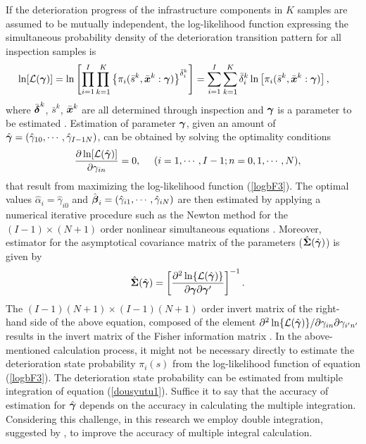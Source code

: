 If the deterioration progress of the infrastructure components in  $K$ samples are assumed to be mutually independent, the log-likelihood function expressing the simultaneous probability density of the deterioration transition pattern for all inspection samples is  
\begin{eqnarray}
&& \hspace{-10mm} \ln[{\cal L}(\mbox{\boldmath$\gamma$})] = \ln
\left[\prod_{i=1}^{I} \prod_{k=1}^{K}
\left\{\pi_{i}(\bar{s}^k,\bar{\mbox{\boldmath$x$}}^k:\mbox{\boldmath$\gamma$})\right\}^{\bar{\delta}_{i}^k}\right]
 =\sum_{i=1}^I \sum_{k=1}^{K} \bar{\delta}_{i}^k
\ln\left[
\pi_{i}(\bar{s}^k,\bar{\mbox{\boldmath$x$}}^k:\mbox{\boldmath$\gamma$})\right],
\label{logbF3}
\end{eqnarray}
where $\bar{\mbox{\boldmath$\delta$}}^k$, $\bar{s}^k$, $\bar{\mbox{\boldmath$x$}}^k$ are all determined through inspection and $\mbox{\boldmath$\gamma$}$ is a parameter to be estimated \cite{tobin,amemi}. Estimation of parameter  $\mbox{\boldmath$\gamma$}$, given an amount of $\hat{\mbox{\boldmath$\gamma$}}=(\hat{\gamma}_{10},\cdots,\hat{\gamma}_{I-1N})$, can be obtained by solving the optimality conditions
\begin{eqnarray}
&& \frac{ \partial \ln[{\cal L}(\hat{\mbox{\boldmath$\gamma$}})] }{\partial
\gamma_{in}}=0, \quad ~(i=1,\cdots,I-1;n=0,1,\cdots,N), \label{saiteki3}
\end{eqnarray}
that result from maximizing the log-likelihood function (\ref{logbF3}). The optimal values $\hat{\alpha}_i=\hat{\gamma}_{i0}$ and $\hat{\mbox{\boldmath$\beta$}}_i=(\hat{\gamma}_{i1},\cdots,\hat{\gamma}_{iN})$ are then estimated by applying a numerical iterative procedure such as the Newton method for the $(I-1)\times (N+1)$ order nonlinear simultaneous equations \cite{tuma}. Moreover, estimator for the asymptotical covariance matrix of the parameters ($\hat{\mbox{\boldmath$\Sigma$}}(\hat{\mbox{\boldmath$\gamma$}})$) is given by
\begin{eqnarray}
&& \hat{\mbox{\boldmath$\Sigma$}}( \hat{\mbox{\boldmath$\gamma$}})
= \left[ \frac{ \partial^2\ln\{ {\cal L}( \hat{\mbox{\boldmath$\gamma$}})\}
}{\partial \mbox{\boldmath$\gamma$} \partial \mbox{\boldmath$\gamma$}'}
\right]^{-1}.
\end{eqnarray}
The $(I-1)(N+1)\times (I-1)(N+1)$ order invert matrix of the right-hand side of the above equation, composed of the element $\partial^2\ln\{{\cal L}(\hat{\mbox{\boldmath$\gamma$}})\}/\partial \gamma_{in} \partial \gamma_{i^\prime n^\prime}$ results in the invert matrix of the Fisher information matrix \cite{greene}. In the above-mentioned calculation process, it might not be necessary directly to estimate the deterioration state probability $\pi_i(s)$ from the log-likelihood function of equation (\ref{logbF3}). The deterioration state probability can be estimated from multiple integration of equation (\ref{dousyutu1}). Suffice it to say that the accuracy of estimation for  $\hat{\mbox{\boldmath$\gamma$}}$ depends on the accuracy in calculating the multiple integration. Considering this challenge, in this research we employ double integration, suggested by \citet{steven98}, to improve the accuracy of multiple integral calculation.
